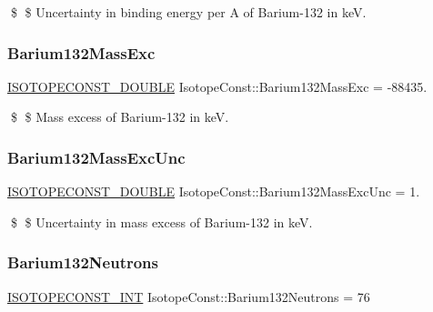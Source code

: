 \$ \$ Uncertainty in binding energy per A of Barium-\/132 in keV. \mbox{\label{group___isotope_const-_barium-_ba132_ga006e576ebef801ca8463cd00fc525904}} 
\subsubsection{\texorpdfstring{Barium132\+Mass\+Exc}{Barium132MassExc}}
{\footnotesize\ttfamily \mbox{\hyperlink{group___isotope_const-_macros_ga8f45a7272ce02c0b4c65c44636ed719a}{I\+S\+O\+T\+O\+P\+E\+C\+O\+N\+S\+T\+\_\+\+D\+O\+U\+B\+LE}} Isotope\+Const\+::\+Barium132\+Mass\+Exc = -\/88435.}

\$ \$ Mass excess of Barium-\/132 in keV. \mbox{\label{group___isotope_const-_barium-_ba132_gaf25ab754636b4e2e36e36f3336c428e8}} 
\subsubsection{\texorpdfstring{Barium132\+Mass\+Exc\+Unc}{Barium132MassExcUnc}}
{\footnotesize\ttfamily \mbox{\hyperlink{group___isotope_const-_macros_ga8f45a7272ce02c0b4c65c44636ed719a}{I\+S\+O\+T\+O\+P\+E\+C\+O\+N\+S\+T\+\_\+\+D\+O\+U\+B\+LE}} Isotope\+Const\+::\+Barium132\+Mass\+Exc\+Unc = 1.}

\$ \$ Uncertainty in mass excess of Barium-\/132 in keV. \mbox{\label{group___isotope_const-_barium-_ba132_ga3ec85e4fd23d5198ffd4b49c0358dc17}} 
\subsubsection{\texorpdfstring{Barium132\+Neutrons}{Barium132Neutrons}}
{\footnotesize\ttfamily \mbox{\hyperlink{group___isotope_const-_macros_ga5f18360b3e99483a35c32d789e62621c}{I\+S\+O\+T\+O\+P\+E\+C\+O\+N\+S\+T\+\_\+\+I\+NT}} Isotope\+Const\+::\+Barium132\+Neutrons = 76}

